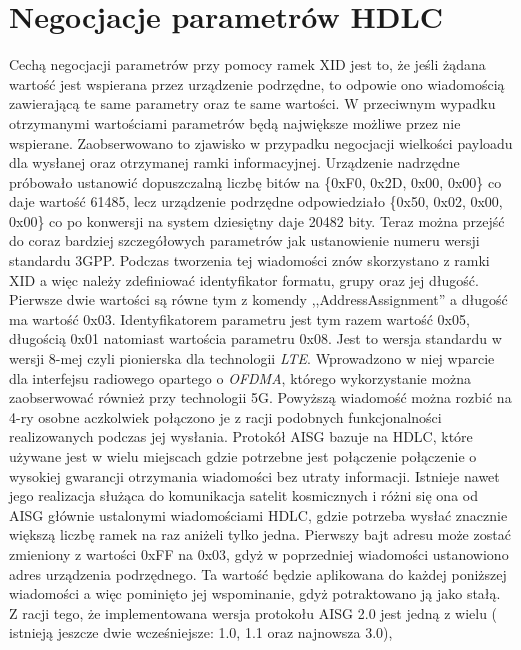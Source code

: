 \section{Negocjacje parametrów HDLC}
Cechą negocjacji parametrów przy pomocy ramek XID jest to, że jeśli żądana wartość jest wspierana przez
urządzenie podrzędne, to odpowie ono wiadomością zawierającą te same parametry oraz te same wartości. 
W przeciwnym wypadku otrzymanymi wartościami parametrów będą największe możliwe przez nie wspierane.
Zaobserwowano to zjawisko w przypadku negocjacji wielkości payloadu dla wysłanej oraz otrzymanej ramki informacyjnej.
Urządzenie nadrzędne próbowało ustanowić dopuszczalną liczbę bitów na \{0xF0, 0x2D, 0x00, 0x00\} co daje wartość 61485,
lecz urządzenie podrzędne odpowiedziało \{0x50, 0x02, 0x00, 0x00\} co po konwersji na system dziesiętny daje 20482 bity.
\newline\newline
Teraz można przejść do coraz bardziej szczegółowych parametrów jak ustanowienie numeru wersji standardu 3GPP.
Podczas tworzenia tej wiadomości znów skorzystano z ramki XID a więc należy zdefiniować identyfikator formatu, grupy oraz jej długość.
Pierwsze dwie wartości są równe tym z komendy ,,AddressAssignment'' a długość ma wartość 0x03.
Identyfikatorem parametru jest tym razem wartość 0x05, długością 0x01 natomiast wartościa parametru 0x08.
Jest to wersja standardu w wersji 8-mej czyli pionierska dla technologii \textit{LTE}.
Wprowadzono w niej wparcie dla interfejsu radiowego opartego o \textit{OFDMA}, którego wykorzystanie można zaobserwować również przy technologii 5G.
\newline\newline
Powyższą wiadomość można rozbić na 4-ry osobne aczkolwiek połączono je z racji podobnych funkcjonalności realizowanych podczas jej wysłania.
Protokół AISG bazuje na HDLC, które używane jest w wielu miejscach
gdzie potrzebne jest połączenie połączenie o wysokiej gwarancji otrzymania wiadomości bez utraty informacji.
Istnieje nawet jego realizacja służąca do komunikacja satelit kosmicznych i różni się ona od AISG głównie
ustalonymi wiadomościami HDLC, gdzie potrzeba wysłać znacznie większą liczbę ramek na raz aniżeli tylko jedna.
Pierwszy bajt adresu może zostać zmieniony z wartości 0xFF na 0x03, gdyż w poprzedniej wiadomości ustanowiono adres urządzenia podrzędnego.
Ta wartość będzie aplikowana do każdej poniższej wiadomości a więc pominięto jej wspominanie,
gdyż potraktowano ją jako stałą.
Z racji tego, że implementowana wersja protokołu AISG 2.0 jest jedną z wielu ( istnieją jeszcze dwie wcześniejsze: 1.0, 1.1 oraz najnowsza 3.0),
